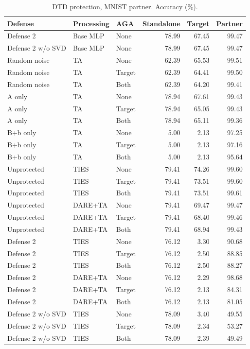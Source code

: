 \begin{table}[t]
\centering\small
\caption{DTD protection, MNIST partner. Accuracy (\%).}
\begin{tabular}{lllrrr}
\toprule
Defense & Processing & AGA & Standalone & Target & Partner \\
\midrule
Defense 2 & Base MLP & None & 78.99 & 67.45 & 99.47 \\
Defense 2 w/o SVD & Base MLP & None & 78.99 & 67.45 & 99.47 \\
Random noise & TA & None & 62.39 & 65.53 & 99.51 \\
Random noise & TA & Target & 62.39 & 64.41 & 99.50 \\
Random noise & TA & Both & 62.39 & 64.20 & 99.41 \\
A only & TA & None & 78.94 & 67.61 & 99.43 \\
A only & TA & Target & 78.94 & 65.05 & 99.43 \\
A only & TA & Both & 78.94 & 65.11 & 99.36 \\
B+b only & TA & None & 5.00 & 2.13 & 97.25 \\
B+b only & TA & Target & 5.00 & 2.13 & 97.16 \\
B+b only & TA & Both & 5.00 & 2.13 & 95.64 \\
Unprotected & TIES & None & 79.41 & 74.26 & 99.60 \\
Unprotected & TIES & Target & 79.41 & 73.51 & 99.60 \\
Unprotected & TIES & Both & 79.41 & 73.51 & 99.61 \\
Unprotected & DARE+TA & None & 79.41 & 69.47 & 99.47 \\
Unprotected & DARE+TA & Target & 79.41 & 68.40 & 99.46 \\
Unprotected & DARE+TA & Both & 79.41 & 68.94 & 99.43 \\
Defense 2 & TIES & None & 76.12 & 3.30 & 90.68 \\
Defense 2 & TIES & Target & 76.12 & 2.50 & 88.85 \\
Defense 2 & TIES & Both & 76.12 & 2.50 & 88.27 \\
Defense 2 & DARE+TA & None & 76.12 & 2.29 & 98.68 \\
Defense 2 & DARE+TA & Target & 76.12 & 2.13 & 84.31 \\
Defense 2 & DARE+TA & Both & 76.12 & 2.13 & 81.05 \\
Defense 2 w/o SVD & TIES & None & 78.09 & 3.40 & 49.55 \\
Defense 2 w/o SVD & TIES & Target & 78.09 & 2.34 & 53.27 \\
Defense 2 w/o SVD & TIES & Both & 78.09 & 2.39 & 49.49 \\
\bottomrule
\end{tabular}
\end{table}

